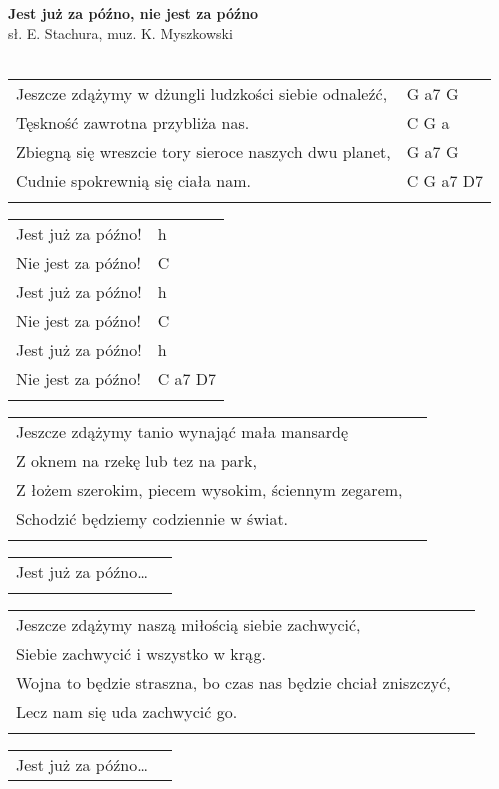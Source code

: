 \documentclass[a5paper]{article}
\begin{document}


\noindent
\fontsize{12pt}{15pt}\selectfont
\textbf{Jest już za późno, nie jest za późno} \\
\fontsize{8pt}{10pt}\selectfont
sł. E. Stachura, muz. K. Myszkowski \\ \\
\fontsize{10pt}{12pt}\selectfont
{}
\begin{tabular}{@{}p{8.70cm}p{3cm}@{}}
\noindent
Jeszcze zdążymy w dżungli ludzkości siebie odnaleźć, & G a7 G \\
Tęskność zawrotna przybliża nas. & C G a \\
Zbiegną się wreszcie tory sieroce naszych dwu planet, & G a7 G \\
Cudnie spokrewnią się ciała nam. & C G a7 D7 \\ \\
\end{tabular}

\noindent
\begin{tabular}{@{}p{7.70cm}p{3cm}@{}}
Jest już za późno! & h \\
Nie jest za późno! & C \\
Jest już za późno! & h \\
Nie jest za późno! & C \\
Jest już za późno! & h \\
Nie jest za późno! & C a7 D7 \\ \\
\end{tabular}

\noindent
\begin{tabular}{@{}p{7.70cm}p{3cm}@{}}
Jeszcze zdążymy tanio wynająć mała mansardę\\
Z oknem na rzekę lub tez na park,\\
Z łożem szerokim, piecem wysokim, ściennym zegarem,\\
Schodzić będziemy codziennie w świat.\\ \\
\end{tabular}

\noindent
\begin{tabular}{@{}p{7.70cm}p{3cm}@{}}
Jest już za późno… \\ \\
\end{tabular}

\noindent
\begin{tabular}{@{}p{9.70cm}p{3cm}@{}}
Jeszcze zdążymy naszą miłością siebie zachwycić,\\
Siebie zachwycić i wszystko w krąg.\\
Wojna to będzie straszna, bo czas nas będzie chciał zniszczyć,\\
Lecz nam się uda zachwycić go.\\ \\
\end{tabular}

\noindent
\begin{tabular}{@{}p{7.70cm}p{3cm}@{}}
Jest już za późno…
\end{tabular}
\end{document}
